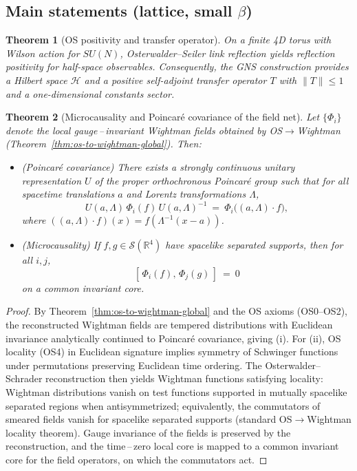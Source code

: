 \documentclass[11pt]{amsart}
\theoremstyle{plain}
\newtheorem{theorem}{Theorem}[section]
\theoremstyle{definition}
\theoremstyle{remark}
\begin{document}
\subsection{Main statements (lattice, small $\beta$)}

\begin{theorem}[OS positivity and transfer operator] \label{thm:os}
On a finite 4D torus with Wilson action for $SU(N)$, Osterwalder--Seiler link reflection yields reflection positivity for half-space observables. Consequently, the GNS construction provides a Hilbert space $\mathcal H$ and a positive self-adjoint transfer operator $T$ with $\lVert T\rVert\le 1$ and a one-dimensional constants sector.
\end{theorem}

\begin{theorem}[Microcausality and Poincar\'e covariance of the field net]\label{thm:microcausality-poincare}
Let $\{\Phi_i\}$ denote the local gauge\,–\,invariant Wightman fields obtained by OS$\to$Wightman (Theorem~\ref{thm:os-to-wightman-global}). Then:
\begin{itemize}
  \item[(i)] (Poincar\'e covariance) There exists a strongly continuous unitary representation $U$ of the proper orthochronous Poincar\'e group such that for all spacetime translations $a$ and Lorentz transformations $\Lambda$,
  \[
    U(a,\Lambda)\,\Phi_i(f)\,U(a,\Lambda)^{-1}\ =\ \Phi_i\big( (a,\Lambda)\cdot f\big),
  \]
  where $((a,\Lambda)\cdot f)(x)=f(\Lambda^{-1}(x-a))$.
  \item[(ii)] (Microcausality) If $f,g\in \mathcal S(\mathbb R^4)$ have spacelike separated supports, then for all $i,j$,
  \[
    [\,\Phi_i(f),\,\Phi_j(g)\,]\ =\ 0
  \]
  on a common invariant core.
\end{itemize}
\end{theorem}
\begin{proof}
By Theorem~\ref{thm:os-to-wightman-global} and the OS axioms (OS0--OS2), the reconstructed Wightman fields are tempered distributions with Euclidean invariance analytically continued to Poincar\'e covariance, giving (i). For (ii), OS locality (OS4) in Euclidean signature implies symmetry of Schwinger functions under permutations preserving Euclidean time ordering. The Osterwalder--Schrader reconstruction then yields Wightman functions satisfying locality: Wightman distributions vanish on test functions supported in mutually spacelike separated regions when antisymmetrized; equivalently, the commutators of smeared fields vanish for spacelike separated supports (standard OS$\to$Wightman locality theorem). Gauge invariance of the fields is preserved by the reconstruction, and the time\,–\,zero local core is mapped to a common invariant core for the field operators, on which the commutators act.
\end{proof}
\end{document}
